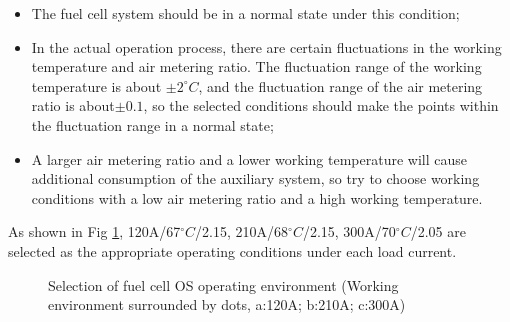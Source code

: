 \begin{itemize}
	\item The fuel cell system should be in a normal state under this condition;
	\item In the actual operation process, there are certain fluctuations in the working temperature and air metering ratio. The fluctuation range of the working temperature is about $\pm2^{\circ}C$, and the fluctuation range of the air metering ratio is about$\pm0.1$, so the selected conditions should make the points within the fluctuation range in a normal state;
	\item A larger air metering ratio and a lower working temperature will cause additional consumption of the auxiliary system, so try to choose working conditions with a low air metering ratio and a high working temperature.
\end{itemize}
As shown in Fig \ref{fig:figure9}, 120A/67$^{\circ}C$/2.15, 210A/68$^{\circ}C$/2.15, 300A/70$^{\circ}C$/2.05 are selected as the appropriate operating conditions under each load current.
\begin{figure}[ht]
	\centering

	\caption{Selection of fuel cell OS operating environment (Working environment surrounded by dots, a:120A; b:210A; c:300A)}
	\label{fig:figure9}
\end{figure}
